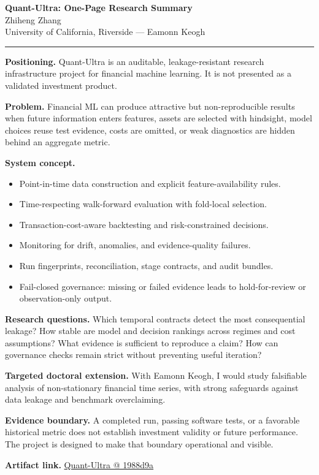 \documentclass[11pt]{article}
\makeatletter
\newcommand{\ApplicantName}{Zhiheng Zhang}
\newcommand{\ApplicantGitHub}{\href{https://github.com/zhiheng-zhang-Mera/Quant-Ultra/tree/1988d9a8530da91a8158de864d098ea869098923}{Quant-Ultra @ 1988d9a}}
\makeatother
\begin{document}
\begin{center}
{\LARGE\bfseries Quant-Ultra: One-Page Research Summary}\\[0.25em]
{\large \ApplicantName}\\
University of California, Riverside --- Eamonn Keogh
\end{center}
\vspace{0.35em}\hrule\vspace{0.65em}

\textbf{Positioning.} Quant-Ultra is an auditable, leakage-resistant research infrastructure project for financial machine learning. It is not presented as a validated investment product.

\textbf{Problem.} Financial ML can produce attractive but non-reproducible results when future information enters features, assets are selected with hindsight, model choices reuse test evidence, costs are omitted, or weak diagnostics are hidden behind an aggregate metric.

\textbf{System concept.}
\begin{itemize}
\item Point-in-time data construction and explicit feature-availability rules.
\item Time-respecting walk-forward evaluation with fold-local selection.
\item Transaction-cost-aware backtesting and risk-constrained decisions.
\item Monitoring for drift, anomalies, and evidence-quality failures.
\item Run fingerprints, reconciliation, stage contracts, and audit bundles.
\item Fail-closed governance: missing or failed evidence leads to hold-for-review or observation-only output.
\end{itemize}

\textbf{Research questions.} Which temporal contracts detect the most consequential leakage? How stable are model and decision rankings across regimes and cost assumptions? What evidence is sufficient to reproduce a claim? How can governance checks remain strict without preventing useful iteration?

\textbf{Targeted doctoral extension.} With Eamonn Keogh, I would study falsifiable analysis of non-stationary financial time series, with strong safeguards against data leakage and benchmark overclaiming.

\textbf{Evidence boundary.} A completed run, passing software tests, or a favorable historical metric does not establish investment validity or future performance. The project is designed to make that boundary operational and visible.

\textbf{Artifact link.} \ApplicantGitHub
\end{document}
